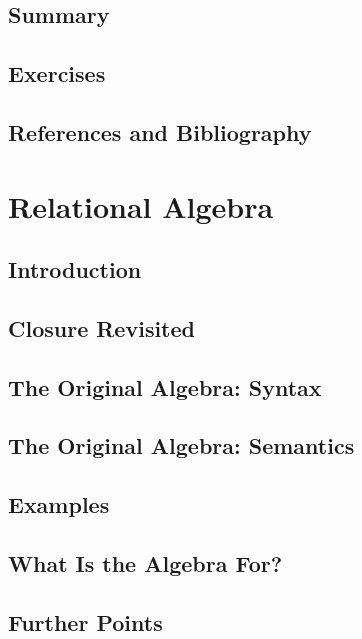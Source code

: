 \documentclass{book}
\begin{document}
\section{Summary}

\section{Exercises}

\section{References and Bibliography}





\chapter{Relational Algebra}

\section{Introduction}

\section{Closure Revisited}

\section{The Original Algebra: Syntax}

\section{The Original Algebra: Semantics}

\section{Examples}

\section{What Is the Algebra For?}

\section{Further Points}
\end{document}

